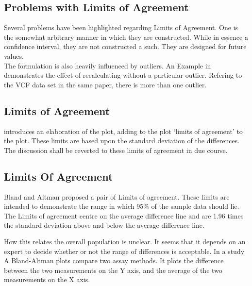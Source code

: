 \documentclass[Main.tex]{subfiles}
\begin{document}
	
	
	
	
	\subsection{Problems with Limits of Agreement}
	
	Several problems have been highlighted regarding Limits of
	Agreement. One is the somewhat arbitrary manner in which they are
	constructed. While in essence a confidence interval, they are not
	constructed a such. They are designed for future values.
	\\
	The formulation is also heavily influenced by outliers. An Example
	in \citet*{BA83} demonstrates the effect of recalculating without
	a particular outlier. Refering to the VCF data set in the same
	paper, there is more than one outlier.
	
	
	
	\subsection{Limits of Agreement}
	\citet{BA86} introduces an elaboration of the plot, adding to the
	plot `limits of agreement' to the plot. These limits are based
	upon the standard deviation of the differences. The discussion
	shall be reverted to these limits of agreement in due course.

	\subsection{Limits Of Agreement}
	Bland and Altman proposed a pair of Limits of agreement. These
	limits are intended to demonstrate the range in which 95\% of the
	sample data should lie. The Limits of agreement centre on the
	average difference line and are 1.96 times the standard deviation
	above and below the average difference line.
	
	How this relates the overall population is unclear. It seems that
	it depends on an expert to decide whether or not the range of
	differences is acceptable. In a study A Bland-Altman plots compare
	two assay methods. It plots the difference between the two
	measurements on the Y axis, and the average of the two
	measurements on the X axis.
	
\end{document}
